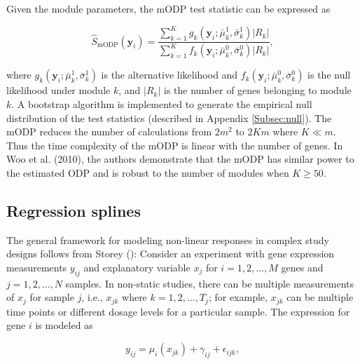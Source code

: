 \documentclass[11pt]{article}
\begin{document}
Given the module parameters, the mODP test statistic can be expressed as

\begin{equation}
\hat{S}_{\text{mODP}}(\mathbf{y}_{i}) = \dfrac{\sum_{k=1}^{K} g_{k}(\mathbf{y}_{i}; \bar{\mu}_{k}^{1}, \bar{\sigma}_{k}^{1}) |R_{k}|}{\sum_{k=1}^{K}f_{k}(\mathbf{y}_{i}; \bar{\mu}_{k}^{0}, \bar{\sigma}_{k}^{0}) |R_{k}|},
\end{equation}

\noindent where $g_{k}(\mathbf{y}_{i}; \bar{\mu}_{k}^{1}, \bar{\sigma}_{k}^{1})$ is the alternative likelihood and $f_{k}(\mathbf{y}_{i}; \bar{\mu}_{k}^{0}, \bar{\sigma}_{k}^{0})$ is the null likelihood under module $k$, and $|R_{k}|$ is the number of genes belonging to module $k$. A bootstrap algorithm is implemented to generate the empirical null distribution of the test statistics (described in Appendix \ref{Subsec:null}). The mODP reduces the number of calculations from $2m^2$ to $2Km$ where $K\ll m$. Thus the time complexity of the mODP is linear with the number of genes. In Woo et al. (2010), the authors demonstrate that the mODP has similar power to the estimated ODP and is robust to the number of modules when $K \geq 50$. 

\subsection{Regression splines} 

The general framework for modeling non-linear responses in complex study designs follows from Storey (\citeyear{Storey_2005_time}): Consider an experiment with gene expression measurements $y_{ij}$ and explanatory variable $x_{j}$ for $i=1,2, ..., M$ genes and $j = 1,2, ..., N$ samples. In non-static studies, there can be multiple measurements of $x_{j}$ for sample $j$, i.e., $x_{jk}$ where $k = 1,2,...,T_{j}$; for example, $x_{jk}$ can be multiple time points or different dosage levels for a particular sample. The expression for gene $i$ is modeled as

\begin{equation}
\label{eq:tc}
y_{ij} = \mu_{i}(x_{jk}) + \gamma_{ij} +  \epsilon_{ijk},
\end{equation}
\end{document}
